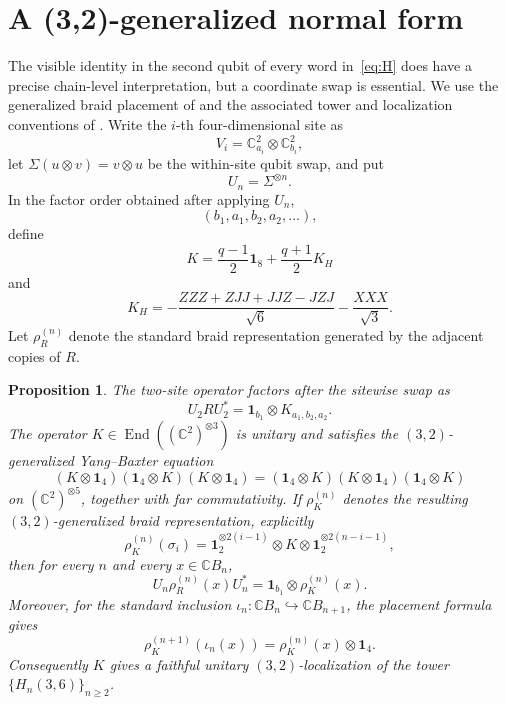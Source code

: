 \documentclass[11pt]{article}
\newtheorem{proposition}[theorem]{Proposition}
\theoremstyle{remark}
\newcommand{\Id}{\mathbf 1}
\newcommand{\End}{\operatorname{End}}
\newcommand{\bbC}{\mathbb C}
\begin{document}
\section{A (3,2)-generalized normal form}\label{sec:gybe}

The visible identity in the second qubit of every word in~\eqref{eq:H}
does have a precise chain-level interpretation, but a coordinate swap is
essential.  We use the generalized braid placement of
\cite[Eq.~(3.9) and Remark~3.10(2)]{GHR2013} and the associated tower and
localization conventions of
\cite[Example~4.23 and Definition~4.24]{GHR2013}.  Write the \(i\)-th
four-dimensional site as
\[
  V_i=\bbC^2_{a_i}\otimes\bbC^2_{b_i},
\]
let \(\Sigma(u\otimes v)=v\otimes u\) be the within-site qubit swap, and put
\[
  U_n=\Sigma^{\otimes n}.
\]
In the factor order obtained after applying \(U_n\),
\[
  (b_1,a_1,b_2,a_2,\ldots),
\]
define
\[
  K=\frac{q-1}{2}\Id_8+\frac{q+1}{2}K_H
\]
and
\begin{equation}
  K_H=
  -\frac{ZZZ+ZJJ+JJZ-JZJ}{\sqrt6}
  -\frac{XXX}{\sqrt3}.
  \label{eq:KH}
\end{equation}
Let \(\rho_R^{(n)}\) denote the standard braid representation generated by
the adjacent copies of \(R\).

\begin{proposition}\label{prop:gybe}
The two-site operator factors after the sitewise swap as
\[
  U_2RU_2^*
  =
  \Id_{b_1}\otimes K_{a_1,b_2,a_2}.
\]
The operator \(K\in\End((\bbC^2)^{\otimes3})\) is unitary and satisfies the
\((3,2)\)-generalized Yang--Baxter equation
\begin{equation}
  (K\otimes\Id_4)(\Id_4\otimes K)(K\otimes\Id_4)
  =
  (\Id_4\otimes K)(K\otimes\Id_4)(\Id_4\otimes K)
  \label{eq:32gybe}
\end{equation}
on \((\bbC^2)^{\otimes5}\), together with far commutativity.  If
\(\rho_K^{(n)}\) denotes the resulting \((3,2)\)-generalized braid
representation, explicitly
\[
  \rho_K^{(n)}(\sigma_i)
  =
  \Id_2^{\otimes2(i-1)}\otimes K
  \otimes\Id_2^{\otimes2(n-i-1)},
\]
then for every \(n\) and every \(x\in\bbC B_n\),
\[
  U_n\rho_R^{(n)}(x)U_n^*
  =
  \Id_{b_1}\otimes\rho_K^{(n)}(x).
\]
Moreover, for the standard inclusion \(\iota_n:\bbC B_n\hookrightarrow
\bbC B_{n+1}\), the placement formula gives
\[
  \rho_K^{(n+1)}(\iota_n(x))
  =\rho_K^{(n)}(x)\otimes\Id_4.
\]
Consequently \(K\) gives a faithful unitary \((3,2)\)-localization of the
tower \(\{H_n(3,6)\}_{n\ge2}\).
\end{proposition}
\end{document}
